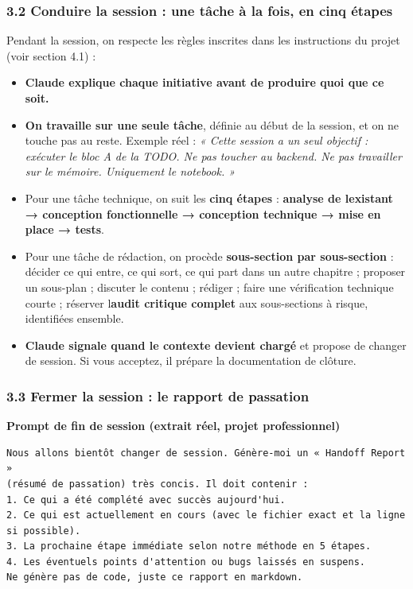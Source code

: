 \documentclass[
  french,
  11pt,
  a4paper,
]{article}
\providecommand{\tightlist}{%
  \setlength{\itemsep}{0pt}\setlength{\parskip}{0pt}}
\begin{document}
\subsubsection{3.2 Conduire la session : une tâche à la fois, en cinq
étapes}\label{32-conduire-la-session--une-tuxe2che-uxe0-la-fois-en-cinq-uxe9tapes}

Pendant la session, on respecte les règles inscrites dans les
instructions du projet (voir section 4.1) :

\begin{itemize}
\tightlist
\item
  \textbf{Claude explique chaque initiative avant de produire quoi que
  ce soit.}
\item
  \textbf{On travaille sur une seule tâche}, définie au début de la
  session, et on ne touche pas au reste. Exemple réel : \emph{« Cette
  session a un seul objectif : exécuter le bloc A de la TODO. Ne pas
  toucher au backend. Ne pas travailler sur le mémoire. Uniquement le
  notebook. »}
\item
  Pour une tâche technique, on suit les \textbf{cinq étapes} :
  \textbf{analyse de l\textquotesingle existant → conception
  fonctionnelle → conception technique → mise en place → tests}.
\item
  Pour une tâche de rédaction, on procède \textbf{sous-section par
  sous-section} : décider ce qui entre, ce qui sort, ce qui part dans un
  autre chapitre ; proposer un sous-plan ; discuter le contenu ; rédiger
  ; faire une vérification technique courte ; réserver
  l\textquotesingle{}\textbf{audit critique complet} aux sous-sections à
  risque, identifiées ensemble.
\item
  \textbf{Claude signale quand le contexte devient chargé} et propose de
  changer de session. Si vous acceptez, il prépare la documentation de
  clôture.
\end{itemize}

\subsubsection{3.3 Fermer la session : le rapport de
passation}\label{33-fermer-la-session--le-rapport-de-passation}

\textbf{Prompt de fin de session (extrait réel, projet professionnel)}

\begin{Verbatim}[breaklines=true,breakanywhere=true,fontsize=\small,frame=leftline,framerule=1.6pt,rulecolor=\color{credixblue},framesep=3mm,xleftmargin=2mm,xrightmargin=1mm]
Nous allons bientôt changer de session. Génère-moi un « Handoff Report »
(résumé de passation) très concis. Il doit contenir :
1. Ce qui a été complété avec succès aujourd'hui.
2. Ce qui est actuellement en cours (avec le fichier exact et la ligne si possible).
3. La prochaine étape immédiate selon notre méthode en 5 étapes.
4. Les éventuels points d'attention ou bugs laissés en suspens.
Ne génère pas de code, juste ce rapport en markdown.
\end{Verbatim}
\end{document}
